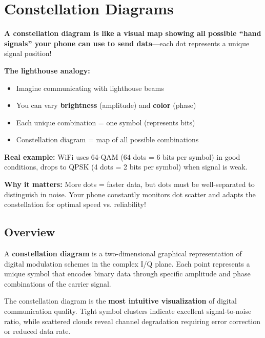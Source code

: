 \chapter{Constellation Diagrams}
\label{ch:constellation-diagrams}

\begin{nontechnical}
\textbf{A constellation diagram is like a visual map showing all possible ``hand signals'' your phone can use to send data}---each dot represents a unique signal position!

\textbf{The lighthouse analogy:}
\begin{itemize}
\item Imagine communicating with lighthouse beams
\item You can vary \textbf{brightness} (amplitude) and \textbf{color} (phase)
\item Each unique combination = one symbol (represents bits)
\item Constellation diagram = map of all possible combinations
\end{itemize}

\textbf{Real example:} WiFi uses 64-QAM (64 dots = 6 bits per symbol) in good conditions, drops to QPSK (4 dots = 2 bits per symbol) when signal is weak.

\textbf{Why it matters:} More dots = faster data, but dots must be well-separated to distinguish in noise. Your phone constantly monitors dot scatter and adapts the constellation for optimal speed vs. reliability!
\end{nontechnical}

\section{Overview}

A \textbf{constellation diagram} is a two-dimensional graphical representation of digital modulation schemes in the complex I/Q plane. Each point represents a unique symbol that encodes binary data through specific amplitude and phase combinations of the carrier signal.

\begin{keyconcept}
The constellation diagram is the \textbf{most intuitive visualization} of digital communication quality. Tight symbol clusters indicate excellent signal-to-noise ratio, while scattered clouds reveal channel degradation requiring error correction or reduced data rate.
\end{keyconcept}

